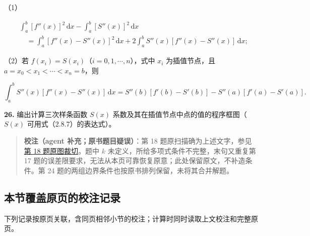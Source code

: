 \documentclass[
  10pt,
  fontset=fandol]{ctexart}
\begin{document}
（1）

\[\begin{aligned}
&\int_a^b[f''(x)]^2\,\mathrm dx-\int_a^b[S''(x)]^2\,\mathrm dx\\
&\quad=\int_a^b[f''(x)-S''(x)]^2\,\mathrm dx+2\int_a^b S''(x)[f''(x)-S''(x)]\,\mathrm dx;
\end{aligned}\]

（2）若 \(f(x_i)=S(x_i)\)（\(i=0,1,\cdots,n\)），式中 \(x_i\) 为插值节点，且 \(a=x_0<x_1<\cdots<x_n=b\)，则

\[\int_a^b S''(x)[f''(x)-S''(x)]\,\mathrm dx=S''(b)[f'(b)-S'(b)]-S''(a)[f'(a)-S'(a)].\]

\textbf{26.} 编出计算三次样条函数 \(S(x)\) 系数及其在插值节点中点的值的程序框图（\(S(x)\) 可用式（2.8.7）的表达式）。

\begin{quote}
\textbf{校注（agent 补充；原书题目疑误）}：第 18 题原扫描确为上述文字，参见\href{../assets/ch02b/pdf-057-exercise-18-detail.png}{第 18 题原图裁切}。题中 \(k\) 未定义，所给多项式条件不完整，末句又重复第 17 题的误差限要求，无法从本页可靠恢复原意；此处保留原文，不补造条件。第 24 题的两组边界条件也按原书排列保留，未将其合并解题。
\end{quote}

\subsection{本节覆盖原页的校注记录}\label{ux672cux8282ux8986ux76d6ux539fux9875ux7684ux6821ux6ce8ux8bb0ux5f55}

下列记录按原页关联，含同页相邻小节的校注；计算时同时读取上文校注和完整原页。
\end{document}
